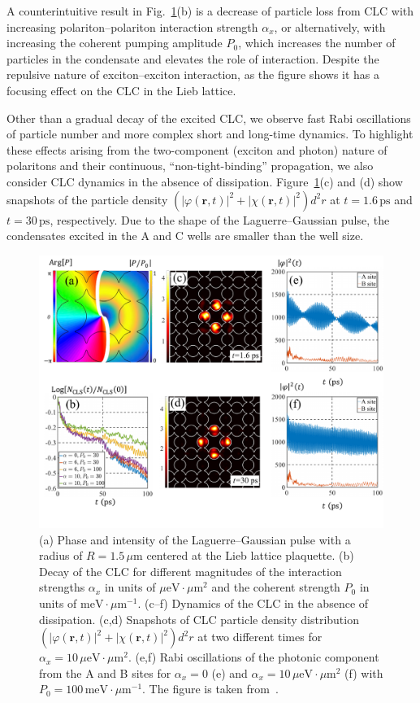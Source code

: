 A counterintuitive result in Fig.~\ref{fig:CH3_2}(b) is a decrease of particle loss from CLC with increasing polariton--polariton interaction strength $\alpha_x$, or alternatively, with increasing the coherent pumping amplitude $P_0$, which increases the number of particles in the condensate and elevates the role of interaction.
Despite the repulsive nature of exciton--exciton interaction, as the figure shows it has a focusing effect on the CLC in the Lieb lattice.

Other than a gradual decay of the excited CLC, we observe fast Rabi oscillations of particle number and more complex short and long-time dynamics.
To highlight these effects arising from the two-component (exciton and photon) nature of polaritons and their continuous, ``non-tight-binding'' propagation, we also consider CLC dynamics in the absence of dissipation.
Figure~\ref{fig:CH3_2}(c) and (d) show snapshots of the particle density $\left(|\varphi(\mathbf{r},t)|^2+|\chi(\mathbf{r},t)|^2\right)d^2r$ at $t=1.6\,\mathrm{ps}$ and $t=30\,\mathrm{ps}$, respectively.
Due to the shape of the Laguerre--Gaussian pulse, the condensates excited in the A and C wells are smaller than the well size.
%
%
%
\begin{figure}[ht]
\centering
\includegraphics[width=0.79\linewidth]{Fig/Ch3/pic2.pdf}
    \caption[Laguerre--Gaussian pulse and corresponding CLC dynamics]{(a) Phase and intensity of the Laguerre--Gaussian pulse with a radius of $R=1.5\,\mu$m centered at the Lieb lattice plaquette. (b) Decay of the CLC for different magnitudes of the interaction strengths $\alpha_x$ in units of $\mu\mathrm{eV}\cdot\mu\mathrm{m}^2$ and the coherent strength $P_0$ in units of $\mathrm{meV}\cdot\mu\mathrm{m}^{-1}$.
(c--f) Dynamics of the CLC in the absence of dissipation.
(c,d) Snapshots of CLC particle density distribution $\left(|\varphi(\mathbf{r},t)|^2+|\chi(\mathbf{r},t)|^2\right)d^2r$
at two different times for $\alpha_x=10\,\mu\mathrm{eV}\cdot\mu\mathrm{m}^2$.
(e,f) Rabi oscillations of the photonic component from the A and B sites for $\alpha_x=0$ (e) and $\alpha_x=10\,\mu\mathrm{eV}\cdot\mu\mathrm{m}^2$ (f) with $P_0=100\,\mathrm{meV}\cdot\mu\mathrm{m}^{-1}$. The figure is taken from~\cite{Sun:2018aa}.
}
\label{fig:CH3_2}
\end{figure}
%
%
%

